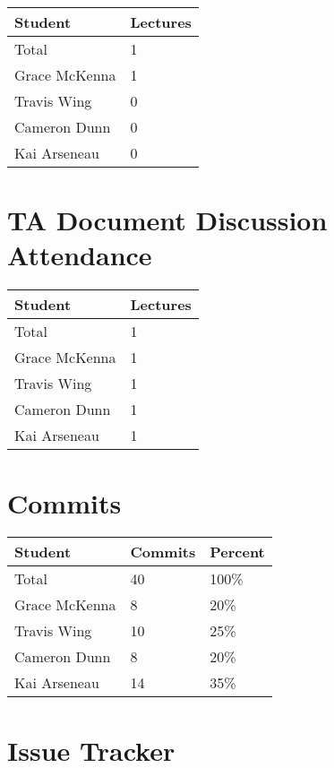 \documentclass{article}
\begin{document}
\begin{table}[H]
\centering
\begin{tabular}{ll}
\toprule
\textbf{Student} & \textbf{Lectures}\\
\midrule
Total & 1\\
Grace McKenna & 1\\
Travis Wing & 0\\
Cameron Dunn & 0\\
Kai Arseneau & 0\\
\bottomrule
\end{tabular}
\end{table}


\section{TA Document Discussion Attendance}


\begin{table}[H]
\centering
\begin{tabular}{ll}
\toprule
\textbf{Student} & \textbf{Lectures}\\
\midrule
Total & 1\\
Grace McKenna & 1\\
Travis Wing & 1\\
Cameron Dunn & 1\\
Kai Arseneau & 1\\
\bottomrule
\end{tabular}
\end{table}


\section{Commits}

\begin{table}[H]
\centering
\begin{tabular}{lll}
\toprule
\textbf{Student} & \textbf{Commits} & \textbf{Percent}\\
\midrule
Total & 40 & 100\% \\
Grace McKenna & 8 & 20\% \\
Travis Wing & 10 & 25\% \\
Cameron Dunn & 8 & 20\% \\
Kai Arseneau & 14 & 35\% \\
\bottomrule
\end{tabular}
\end{table}


\section{Issue Tracker}
\end{document}
